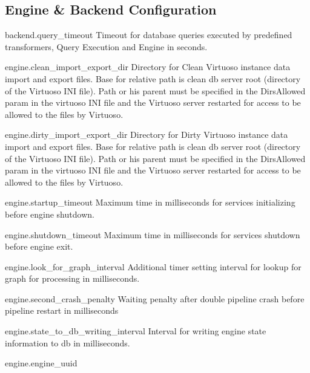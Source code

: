 \subsection*{Engine \& Backend Configuration}
\begin{configlist}
	\item[backend.query\_timeout]
		Timeout for database queries executed by predefined transformers, Query Execution and Engine in seconds.

	\item[engine.clean\_import\_export\_dir]
		Directory for Clean Virtuoso instance data import and export files. Base for relative path is clean db server root (directory of the Virtuoso INI file). Path or his parent must be specified in the DirsAllowed param in the virtuoso INI file and the Virtuoso server restarted for access to be allowed to the files by Virtuoso.
		
	\item[engine.dirty\_import\_export\_dir]
		Directory for Dirty Virtuoso instance data import and export files. Base for relative path is clean db server root (directory of the Virtuoso INI file). Path or his parent must be specified in the DirsAllowed param in the virtuoso INI file and the Virtuoso server restarted for access to be allowed to the files by Virtuoso.  
		
	\item[engine.startup\_timeout]
		Maximum time in milliseconds for services initializing before engine shutdown.
		
	\item[engine.shutdown\_timeout]
		Maximum time in milliseconds for services shutdown before engine exit.
	
	\item[engine.look\_for\_graph\_interval]
		Additional timer setting interval for lookup for graph for processing in milliseconds.
		
	\item[engine.second\_crash\_penalty]
		Waiting penalty after double pipeline crash before pipeline restart in milliseconds
		
	\item[engine.state\_to\_db\_writing\_interval]
		Interval for writing engine state information to db in milliseconds.
	
	\item[engine.engine\_uuid]
\end{configlist}


